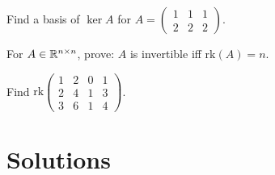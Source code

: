 \begin{problems}
    \item Find a basis of $\ker A$ for $A = \begin{pmatrix} 1 & 1 & 1 \\ 2 & 2 & 2 \end{pmatrix}$.
    \item For $A \in \mathbb{R}^{n \times n}$, prove: $A$ is invertible iff $\mathrm{rk}(A) = n$.
    \item Find $\mathrm{rk}\!\begin{pmatrix} 1 & 2 & 0 & 1 \\ 2 & 4 & 1 & 3 \\ 3 & 6 & 1 & 4 \end{pmatrix}$.
\end{problems}

\section{Solutions}

